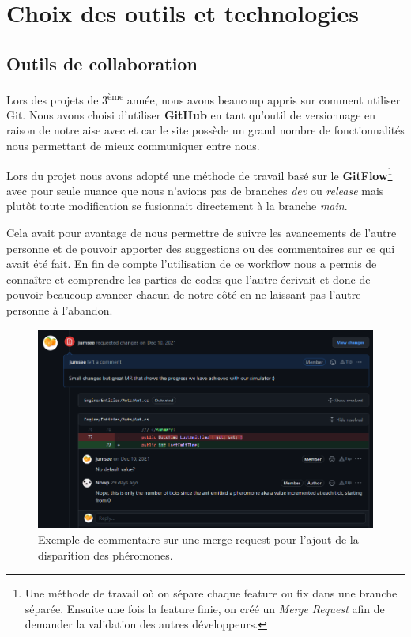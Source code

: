 \documentclass{EPUProjetDi}
\begin{document}
\section{Choix des outils et technologies}

\subsection{Outils de collaboration}

Lors des projets de 3\textsuperscript{ème} année, nous avons beaucoup appris sur comment utiliser
Git. Nous avons choisi d'utiliser \textbf{GitHub} en tant qu'outil de versionnage en raison de notre aise avec et
car le site possède un grand nombre de fonctionnalités nous permettant de mieux communiquer entre
nous.

Lors du projet nous avons adopté une méthode de travail basé sur le \textbf{GitFlow}\footnote{Une méthode de travail où on sépare chaque feature ou fix dans une branche séparée.
Ensuite une fois la feature finie, on créé un \textit{Merge Request} afin de demander la validation des autres développeurs.} avec pour seule nuance que nous n'avions pas de branches \textit{dev} ou \textit{release}
mais plutôt toute modification se fusionnait directement à la branche \textit{main}.

Cela avait pour avantage de nous permettre de suivre les avancements de l'autre personne et de pouvoir 
apporter des suggestions ou des commentaires sur ce qui avait été fait. 
En fin de compte l'utilisation de ce workflow nous a permis de connaître et comprendre 
les parties de codes que l'autre écrivait et donc de pouvoir beaucoup avancer chacun de notre
côté en ne laissant pas l'autre personne à l'abandon.

\begin{figure}[h!]
\centering
\includegraphics[scale=.5]{merge_request.png}
\caption{Exemple de commentaire sur une merge request pour l'ajout de la disparition des phéromones.}
\label{fig:MergeRequest}
\end{figure}
\end{document}
